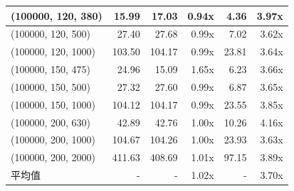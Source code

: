 \documentclass[a4paper]{article}
\begin{document}
\begin{table}[tbp]
\begin{tabular}{l|r|rr|rr}
    \midrule
    (100000, 120, 380)  & 15.99           & 17.03               & 0.94x   & 4.36            & 3.97x   \\
    \midrule
    (100000, 120, 500)  & 27.40           & 27.68               & 0.99x   & 7.02            & 3.62x   \\
    \midrule
    (100000, 120, 1000) & 103.50          & 104.17              & 0.99x   & 23.81           & 3.64x   \\
    \midrule
    (100000, 150, 475)  & 24.96           & 15.09               & 1.65x   & 6.23            & 3.66x   \\
    \midrule
    (100000, 150, 500)  & 27.32           & 27.60               & 0.99x   & 6.87            & 3.65x   \\
    \midrule
    (100000, 150, 1000) & 104.12          & 104.17              & 0.99x   & 23.55           & 3.85x   \\
    \midrule
    (100000, 200, 630)  & 42.89           & 42.76               & 1.00x   & 10.26           & 4.16x   \\
    \midrule
    (100000, 200, 1000) & 104.67          & 104.26              & 1.00x   & 23.93           & 3.63x   \\
    \midrule
    (100000, 200, 2000) & 411.63          & 408.69              & 1.01x   & 97.15           & 3.89x   \\
    \midrule
    平均值              & -               & -                   & 1.02x   & -               & 3.70x   \\
    \bottomrule
  \end{tabular}
  \label{tlb:perf}
\end{table}
\end{document}
